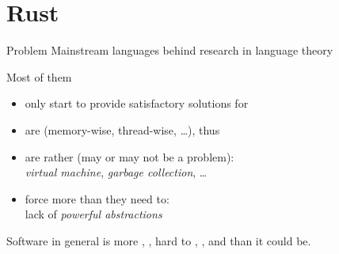 \documentclass[10pt]{beamer}
\begin{document}
\section{Rust}





\begin{frame}{Problem}
  Mainstream languages  behind research in language theory
  \bigskip

  Most of them
  \begin{itemize}
    \item only start to provide satisfactory solutions for 
    \item are  (memory-wise, thread-wise, \ldots),
      thus 
    \item are rather  (may or may not be a problem):\\
      \emph{virtual machine}, \emph{garbage collection}, \ldots
    \item force more  than they need to:\\
      lack of \emph{powerful abstractions}
  \end{itemize}
  \medskip
  \pause

  Software in general is more , , hard to
  , ,  and  than it
  could be.
\end{frame}
\end{document}
